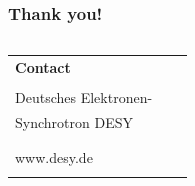 




\begin{frame}
\frametitle{Thank you!}
\vfill{}
\vspace*{3.5cm}


\fontsize{8}{9}\selectfont
\begin{columns}
	\hspace*{-0.8em}
	\hspace*{-1em}  %
	\begin{column}{\textwidth}
		\begin{tabular}{lll}
		\textbf{Contact}&\hspace*{0.5cm} & \\
						&\hspace*{0.5cm} & \\
		\hspace*{-0.4mm}Deutsches Elektronen-&\hspace*{0.5cm} & \AUTHOR\\
		\hspace*{-0.4mm}Synchrotron DESY&\hspace*{0.5cm} & \ORCiD{\ORCID}\\
							&\hspace*{0.5cm} & \GROUP\\
							&\hspace*{0.5cm} & \MailTo{\EMAIL}\\
		\hspace*{-0.4mm}www.desy.de			&\hspace*{0.5cm} & \PHONE\\
							&\hspace*{0.5cm} & \DOIlink{\DOI}\\
		\end{tabular}
	\end{column}
\end{columns}


\end{frame}


